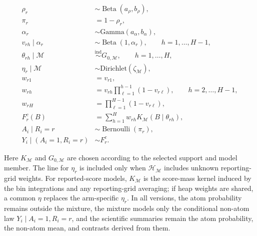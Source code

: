\documentclass[11pt]{article}
\DeclareMathOperator*{\Bernoulli}{Bernoulli}
\DeclareMathOperator*{\Beta}{Beta}
\begin{document}
\begin{model}[t]
\centering
\begin{minipage}{0.95\linewidth}
\begin{equation}
\begin{aligned}
  \rho_r
  &\sim \Beta(a_{\rho}, b_{\rho}),\\
  \pi_r
  &= 1 - \rho_r,\\
  \alpha_r
  &\sim \mathrm{Gamma}(a_{\alpha}, b_{\alpha}),\\
  v_{rh} \mid \alpha_r
  &\sim \Beta(1,\alpha_r),
  \qquad
  h = 1,\ldots,H-1,\\
  \theta_{rh} \mid \mathcal M
  &\stackrel{\mathrm{ind}}{\sim} G_{0,\mathcal M},
  \qquad
  h = 1,\ldots,H,\\
  \eta_r \mid \mathcal M
  &\sim \mathrm{Dirichlet}(\zeta_{\mathcal M}),\\
  w_{r1}
  &= v_{r1},\\
  w_{rh}
  &= v_{rh}\prod_{\ell=1}^{h-1}(1-v_{r\ell}),
  \qquad
  h = 2,\ldots,H-1,\\
  w_{rH}
  &= \prod_{\ell=1}^{H-1}(1-v_{r\ell}),\\
  F_r^c(B)
  &= \sum_{h=1}^{H} w_{rh}K_{\mathcal M}(B \mid \theta_{rh}),\\
  A_i \mid R_i = r
  &\sim \Bernoulli(\pi_r),\\
  Y_i \mid (A_i = 1, R_i = r)
  &\sim F_r^c.
\end{aligned}
  \label{eq:bayes-hierarchy}
\end{equation}
\end{minipage}
\caption{General no-covariate Bayesian hierarchy for a selected model member $\mathcal M$.}
\label{model:bayes-hierarchy}
\end{model}
Here $K_{\mathcal M}$ and $G_{0,\mathcal M}$ are chosen according to the selected support and model member. The line for $\eta_r$ is included only when $\mathcal H_{\mathcal M}$ includes unknown reporting-grid weights. For reported-score models, $K_{\mathcal M}$ is the score-mass kernel induced by the bin integrations and any reporting-grid averaging; if heap weights are shared, a common $\eta$ replaces the arm-specific $\eta_r$. In all versions, the atom probability remains outside the mixture, the mixture models only the conditional non-atom law $Y_i\mid A_i=1,R_i=r$, and the scientific summaries remain the atom probability, the non-atom mean, and contrasts derived from them.
\end{document}
